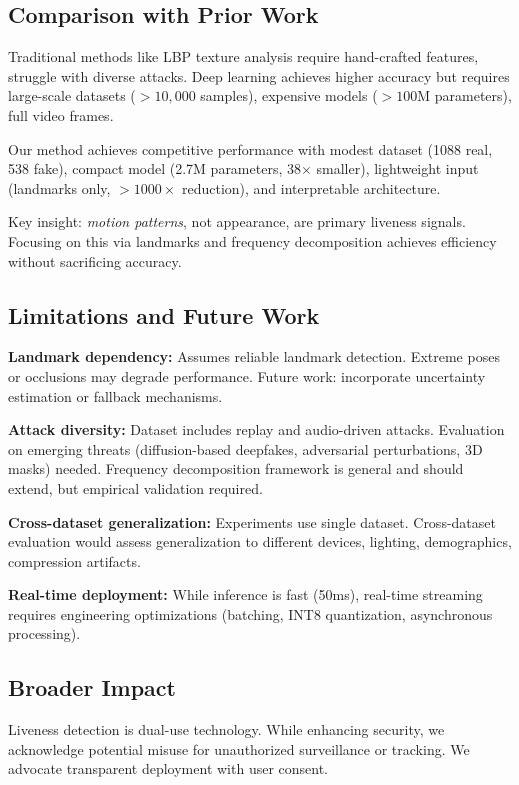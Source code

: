 \documentclass[10pt,twocolumn,letterpaper]{article}
\begin{document}
\subsection{Comparison with Prior Work}

Traditional methods like LBP texture analysis require hand-crafted features, struggle with diverse attacks. Deep learning achieves higher accuracy but requires large-scale datasets ($>10,000$ samples), expensive models ($>100$M parameters), full video frames.

Our method achieves competitive performance with modest dataset (1088 real, 538 fake), compact model (2.7M parameters, 38$\times$ smaller), lightweight input (landmarks only, $>1000\times$ reduction), and interpretable architecture.

Key insight: \emph{motion patterns}, not appearance, are primary liveness signals. Focusing on this via landmarks and frequency decomposition achieves efficiency without sacrificing accuracy.

\subsection{Limitations and Future Work}

\textbf{Landmark dependency:} Assumes reliable landmark detection. Extreme poses or occlusions may degrade performance. Future work: incorporate uncertainty estimation or fallback mechanisms.

\textbf{Attack diversity:} Dataset includes replay and audio-driven attacks. Evaluation on emerging threats (diffusion-based deepfakes, adversarial perturbations, 3D masks) needed. Frequency decomposition framework is general and should extend, but empirical validation required.

\textbf{Cross-dataset generalization:} Experiments use single dataset. Cross-dataset evaluation would assess generalization to different devices, lighting, demographics, compression artifacts.

\textbf{Real-time deployment:} While inference is fast (50ms), real-time streaming requires engineering optimizations (batching, INT8 quantization, asynchronous processing).

\subsection{Broader Impact}

Liveness detection is dual-use technology. While enhancing security, we acknowledge potential misuse for unauthorized surveillance or tracking. We advocate transparent deployment with user consent.
\end{document}
